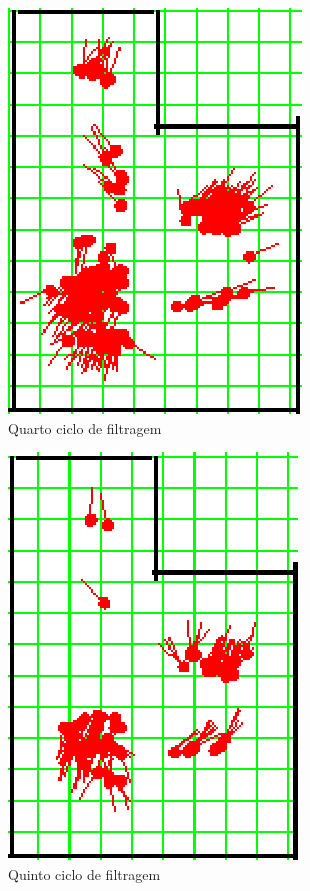 \begin{figure}[H]
  \centering
  \includegraphics[scale=0.6]{figuras/cen1_ex3/5.eps}
  \caption[Quarto Ciclo de Filtragem]{Quarto ciclo de filtragem}
  \label{img:cen1_ex3_5}
\end{figure}

\begin{figure}[H]
  \centering
  \includegraphics[scale=0.6]{figuras/cen1_ex3/6.eps}
  \caption[Quinto Ciclo de Filtragem]{Quinto ciclo de filtragem}
  \label{img:cen1_ex3_6}
\end{figure}

